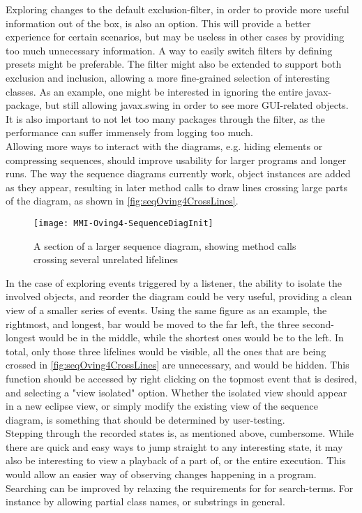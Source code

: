 Exploring changes to the default exclusion-filter, in order to provide more useful information out of the box, is also an option.
This will provide a better experience for certain scenarios, but may be useless in other cases by providing too much unnecessary information.
A way to easily switch filters by defining presets might be preferable.
The filter might also be extended to support both exclusion and inclusion, allowing a more fine-grained selection of interesting classes.
As  an example, one might be interested in ignoring the entire javax-package, but still allowing javax.swing in order to see more GUI-related objects.
It is also important to not let too many packages through the filter, as the performance can suffer immensely from logging too much.
~\\

Allowing more ways to interact with the diagrams, e.g. hiding elements or compressing sequences, should improve usability for larger programs and longer runs.
The way the sequence diagrams currently work, object instances are added as they appear, resulting in later method calls to draw lines crossing large parts of the diagram, as shown in \autoref{fig:seqOving4CrossLines}.
\begin{figure}[H]
	\centering
	\texttt{[image: MMI-Oving4-SequenceDiagInit]}
	\caption{A section of a larger sequence diagram, showing method calls crossing several unrelated lifelines}
	\label{fig:seqOving4CrossLines}
\end{figure}
In the case of exploring events triggered by a listener, the ability to isolate the involved objects, and reorder the diagram could be very useful, providing a clean view of a smaller series of events.%
Using the same figure as an example, the rightmost, and longest, bar would be moved to the far left, the three second-longest would be in the middle, while the shortest ones would be to the left.
In total, only those three lifelines would be visible, all the ones that are being crossed in \autoref{fig:seqOving4CrossLines} are unnecessary, and would be hidden.
This function should be accessed by right clicking on the topmost event that is desired, and selecting a "view isolated" option.
Whether the isolated view should appear in a new eclipse view, or simply modify the existing view of the sequence diagram,  is something that should be determined by user-testing.
~\\

Stepping through the recorded states is, as mentioned above, cumbersome.
While there are quick and easy ways to jump straight to any interesting state, it may also be interesting to view a playback of a part of, or the entire execution.
This would allow an easier way of observing changes happening in a program.
~\\

Searching can be improved by relaxing the requirements for for search-terms.
For instance by allowing partial class names, or substrings in general.
